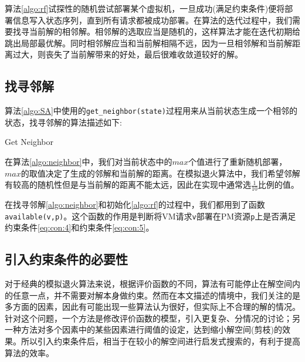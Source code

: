 算法\ref{algo:rf}试探性的随机尝试部署某个虚拟机，一旦成功(满足约束条件)便将部署信息写入状态序列，直到所有请求都被成功部署。在算法的迭代过程中，我们需要找寻当前解的相邻解。相邻解的选取应当是随机的，这样算法才能在迭代初期给跳出局部最优解。同时相邻解应当和当前解相隔不远，因为一旦相邻解和当前解距离过大，则丧失了当前解带来的好处，最后很难收敛道较好的解。

\subsection*{找寻邻解}
\label{sec:neighbor-algo}
算法\ref{algo:SA}中使用的\texttt{get\_neighbor(state)}过程用来从当前状态生成一个相邻的状态，找寻邻解的算法描述如下:

\begin{algorithm}[H]
  \DontPrintSemicolon
  
  \caption{Get Neighbor\label{algo:neighbor}}
\end{algorithm}

在算法\ref{algo:neighbor}中，我们对当前状态中的$max$个值进行了重新随机部署，$max$的取值决定了生成的邻解和当前解的距离。在模拟退火算法中，我们希望邻解有较高的随机性但是与当前解的距离不能太远，因此在实现中通常选$\frac{1}{10}$比例的值。

在找寻邻解\ref{algo:neighbor}和初始化\ref{algo:rf}的过程中，我们都用到了函数\texttt{available(v,p)}。这个函数的作用是判断将VM请求\texttt{v}部署在PM资源\texttt{p}上是否满足约束条件\ref{eq:con:4}和约束条件\ref{eq:con:5}。

\subsection*{引入约束条件的必要性}
对于经典的模拟退火算法来说，根据评价函数的不同，算法有可能停止在解空间内的任意一点，并不需要对解本身做约束。然而在本文描述的情境中，我们关注的是多方面的因素，因此有可能出现一些算法认为很好，但实际上不合理的解的情况。针对这个问题，一个方法是修改评价函数的模型，引入更复杂、分情况的讨论；另一种方法对多个因素中的某些因素进行阈值的设定，达到缩小解空间(剪枝)的效果。所以引入约束条件后，相当于在较小的解空间进行启发式搜索的，有利于提高算法的效率。

